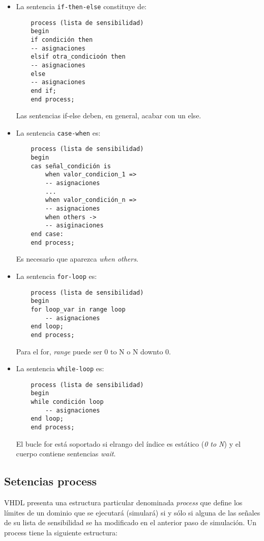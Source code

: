 \begin{itemize}
    \item La sentencia \texttt{if-then-else} constituye de: 
    \begin{lstlisting}
    process (lista de sensibilidad)
    begin
    if condición then 
    -- asignaciones 
    elsif otra_condicioón then
    -- asignaciones 
    else 
    -- asignaciones 
    end if;
    end process;
    \end{lstlisting}
    Las sentencias if-else deben, en general, acabar con un else. 
    \item La sentencia \texttt{case-when} es: 
    \begin{lstlisting}
    process (lista de sensibilidad)
    begin
    cas señal_condición is 
        when valor_condicion_1 => 
        -- asignaciones
        ...
        when valor_condición_n =>
        -- asignaciones 
        when others ->
        -- asiginaciones
    end case: 
    end process;
    \end{lstlisting}
    Es necesario que aparezca \textit{when others}.   
    \item La sentencia \texttt{for-loop} es: 
    \begin{lstlisting}
    process (lista de sensibilidad)
    begin 
    for loop_var in range loop
        -- asignaciones
    end loop;
    end process;
    \end{lstlisting}
    Para el for, \textit{range} puede ser 0 to N o N downto 0.
    \item La sentencia \texttt{while-loop} es: 
    \begin{lstlisting}
    process (lista de sensibilidad)
    begin
    while condición loop    
        -- asignaciones
    end loop;
    end process;
    \end{lstlisting}
    El bucle for está soportado si elrango del índice es estático (\textit{0 to N}) y el cuerpo contiene sentencias \textit{wait}. 
\end{itemize}


\subsection{Setencias process}

VHDL presenta una estructura particular denominada \textit{process} que define los límites de un dominio que se ejecutará (simulará) si y sólo si alguna de las señales de su lista de sensibilidad se ha modificado en el anterior paso de simulación. Un process tiene la siguiente estructura: 

